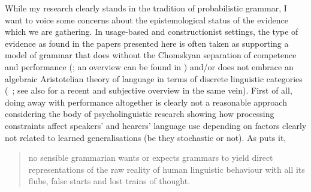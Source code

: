 While my research clearly stands in the tradition of probabilistic grammar, I want to voice some concerns about the epistemological status of the evidence which we are gathering.
In usage-based and constructionist settings, the type of evidence as found in the papers presented here is often taken as supporting a model of grammar that does without the Chomskyan separation of competence and performance (\citealt{Chomsky1965}; an overview can be found in \citealt[507--518]{Mueller2018}) and\slash or does not embrace an algebraic Aristotelian theory of language in terms of discrete linguistic categories (\eeg\ \citealt{Manning2002,Bod2006}; see also \citealt{Kapatsinski2014} for a recent and subjective overview in the same vein).
First of all, doing away with performance altogether is clearly not a reasonable approach considering the body of psycholinguistic research showing how processing constraints affect speakers' and hearers' language use depending on factors clearly not related to learned generalisations (be they stochastic or not).
As \citet[532]{Pullum2013a} puts it,

\begin{quote}
  no sensible grammarian wants or expects grammars to yield direct representations of the raw reality of human linguistic behaviour with all its flubs, false starts and lost trains of thought.
\end{quote}

